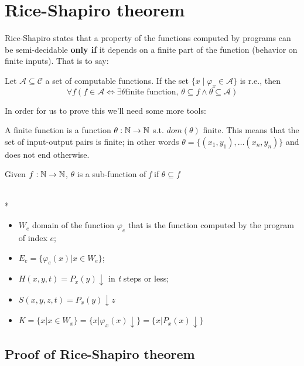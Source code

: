 \chapter {Rice-Shapiro theorem}
Rice-Shapiro states that a property of the functions computed by
programs can be semi-decidable \textbf{only if} it depends on a finite
part of the function (behavior on finite inputs). That is to say:

\begin{theorem}

  Let $\mathcal{A} \subseteq \mathcal{C}$ a set of computable
  functions. If the set $\{x \mid \varphi_x \in \mathcal{A}\}$ is
  r.e., then
  \[
    \forall f (f \in \mathcal{A} \Leftrightarrow \exists \theta \mbox{
      finite function, } \theta \subseteq f \land \theta \subseteq
    \mathcal{A})
  \]
\end{theorem}

In order for us to prove this we'll need some more tools:

\begin{definition}
  A finite function is a function $ \theta: \mathbb{N}\rightarrow\mathbb{N} $
  s.t. $ dom(\theta) $ finite.  This means that the set of
  input-output pairs is finite; in other words
  $ \theta = \{(x_1,y_1),\dots(x_n,y_n) \} $ and does not end
  otherwise.
\end{definition}

Given $ f:\mathbb{N}\rightarrow\mathbb{N} $, $ \theta $ is a sub-function of
\textit{f} if $ \theta \subseteq f $

\begin{notation}\mbox{}\\*
  \begin{itemize}
  \item $ W_e $ domain of the function $ \varphi_e $ that is the function
    computed by the program of index $e$;
  \item $ E_e = \{\varphi_e(x)|x\in W_e \}$;
  \item $ H(x,y,t) = P_x(y)\downarrow $ in \textit{t} steps or less;
  \item $ S(x,y,z,t) = P_x(y)\downarrow z $
  \item $ K = \{x|x\in W_x \} = \{x|\varphi_x(x)\downarrow \} =
    \{x|P_x(x)\downarrow \}$
  \end{itemize}
\end{notation}

\section{Proof of Rice-Shapiro theorem}


